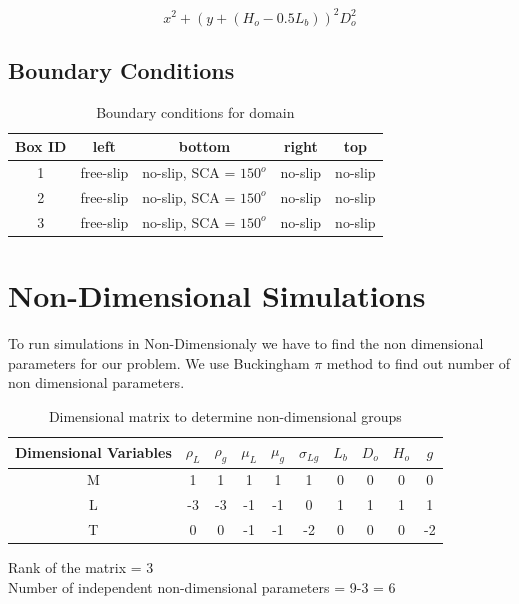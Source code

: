 \begin{equation}
 x^2+(y+(H_o-0.5L_b))^2D_{o}^{2}  %
\end{equation}

\subsection{Boundary Conditions}
\begin{table}[H]
\centering
\begin{tabular}{||c c c c c||}
\hline
 Box ID & left & bottom & right & top  \\ 
 \hline\hline
 1 & free-slip & no-slip, SCA = $150^o$ & no-slip & no-slip  \\ 
 \hline
 2 & free-slip & no-slip, SCA = $150^o$ & no-slip & no-slip  \\ 
 \hline
 3 & free-slip & no-slip, SCA = $150^o$ & no-slip & no-slip  \\ 
 \hline
\end{tabular}
 \caption{Boundary conditions for domain}
\end{table}

\section{Non-Dimensional Simulations}

To run simulations in Non-Dimensionaly we have to find the non dimensional parameters for our problem.
We use Buckingham $\pi$ method to find out number of non dimensional parameters.
\begin{table}[H]
\centering
\caption{Dimensional matrix to determine non-dimensional groups}
\begin{tabular}{||c c c c c c c c c c||}
 \hline
 Dimensional Variables & $\rho_L$ & $\rho_g$ & $\mu_L$ & $\mu_g$ & $\sigma_{Lg}$ & $L_b$ & $D_o$ & $H_o$ & $g$ \\
 \hline\hline
 M & 1 & 1 & 1 & 1 & 1 & 0 & 0 & 0 & 0 \\
 \hline
 L & -3 & -3 & -1 & -1 & 0 & 1 & 1 & 1 & 1\\
 \hline
 T & 0 & 0 & -1 & -1& -2 & 0 & 0 & 0 & -2 \\
 \hline
\end{tabular}
\end{table}

Rank of the matrix = 3 \\

Number of independent non-dimensional parameters = 9-3 = 6 \\
